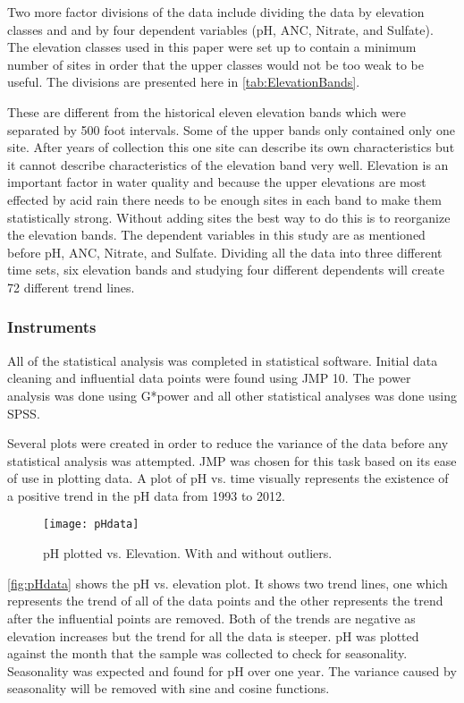  Two more factor divisions of the data include dividing the data by elevation classes and and by four dependent variables (pH, ANC, Nitrate, and Sulfate).  The elevation classes used in this paper were set up to contain a minimum number of sites in order that the upper classes would not be too weak to be useful.  The divisions are presented here in \autoref{tab:ElevationBands}.

These are different from the historical eleven elevation bands which were separated by 500 foot intervals.  Some of the upper bands only contained only one site.  After years of collection this one site can describe its own characteristics but it cannot describe characteristics of the elevation band very well.  Elevation is an important factor in water quality and because the upper elevations are most effected by acid rain there needs to be enough sites in each band to make them statistically strong.  Without adding sites the best way to do this is to reorganize the elevation bands.  The dependent variables in this study are as mentioned before pH, ANC, Nitrate, and Sulfate.  %
Dividing all the data into three different time sets, six elevation bands and studying four different dependents will create 72 different trend lines.

\subsubsection{Instruments}

All of the statistical analysis was completed in statistical software.  Initial data cleaning and influential data points were found using JMP 10.  The power analysis was done using G*power and all other statistical analyses was done using SPSS.

Several plots were created in order to reduce the variance of the data before any statistical analysis was attempted.  JMP was chosen for this task based on its ease of use in plotting data.  A plot of pH vs. time visually represents the existence of a positive trend in the pH data from 1993 to 2012.
\begin{figure}[h!]
\centering
  \texttt{[image: pHdata]}\\
  \caption{pH plotted vs. Elevation.  With and without outliers.}\label{fig:pHdata}
\end{figure}
\autoref{fig:pHdata} shows the pH vs. elevation plot.  It shows two trend lines, one which represents the trend of all of the data points and the other represents the trend after the influential points are removed.  Both of the trends are negative as elevation increases but the trend for all the data is steeper.  pH was plotted against the month that the sample was collected to check for seasonality.  Seasonality was expected and found for pH over one year.  The variance caused by seasonality will be removed with sine and cosine functions. 

